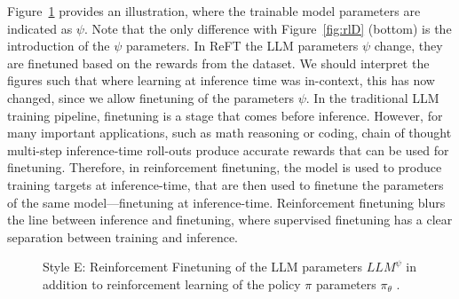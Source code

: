 Figure~\ref{fig:rlE} provides an illustration, where the trainable model parameters are indicated as $\psi$. Note that the only difference with Figure~\ref{fig:rlD} (bottom) is the introduction of the $\psi$ parameters. In ReFT the LLM parameters $\psi$ change, they are finetuned  based on the rewards from the dataset. %
We should interpret the figures such that where learning at inference time was in-context, this has now changed, since we allow finetuning of the  parameters $\psi$. 
%
In the traditional LLM training pipeline, finetuning is a stage that comes before inference. However, for many important applications, such as math reasoning or coding, chain of thought multi-step inference-time roll-outs produce accurate rewards that can be used for finetuning. Therefore, in reinforcement finetuning, the model is  used to produce training targets at inference-time, that are then used to finetune the parameters of the same model---finetuning at inference-time. Reinforcement finetuning blurs the line between inference and finetuning, where supervised finetuning has a clear separation between training and inference.



\begin{figure}
  \begin{center}
    
    \caption{Style E: Reinforcement Finetuning of the LLM parameters
      $LLM^\psi$ in addition to  reinforcement learning of the
      policy $\pi$ parameters $\pi_\theta$
      \citep{luong2024reft}.}\label{fig:rlE} 
  \end{center}
\end{figure}

